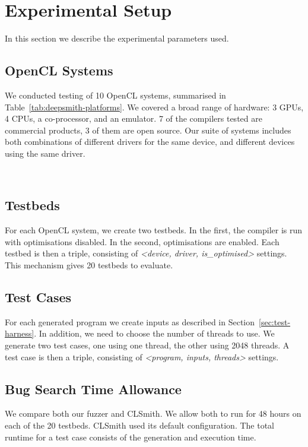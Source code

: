\section{Experimental Setup}
\label{sec:deepsmith-experimental-setup}

In this section we describe the experimental parameters used.

\subsection{OpenCL Systems}

We conducted testing of 10 OpenCL systems, summarised in
Table~\ref{tab:deepsmith-platforms}. We covered a broad range of hardware: 3 GPUs, 4
CPUs, a co-processor, and an emulator. 7 of the compilers tested are commercial
products, 3 of them are open source. Our suite of systems includes both
combinations of different drivers for the same device, and different devices
using the same driver.

\begin{table}
	\centering %
	\subfloat{}\\ %
  \subfloat{} %
	\caption[OpenCL systems and the number of bug reports submitted to date]{%
		OpenCL systems and the number of bug reports submitted to date (22\% of which have been fixed, the remainder are pending). For each system, two testbeds are created, one with compiler optimisations, the other without.%
	}
	\label{tab:deepsmith-platforms}
\end{table}

\subsection{Testbeds}

For each OpenCL system, we create two testbeds. In the first, the compiler is
run with optimisations disabled. In the second, optimisations are enabled. Each
testbed is then a triple, consisting of \emph{<device, driver, is\_optimised>}
settings. This mechanism gives 20 testbeds to evaluate.


\subsection{Test Cases}

For each generated program we create inputs as described in
Section~\ref{sec:test-harness}. In addition, we need to choose the number of
threads to use. We generate two test cases, one using one thread, the other
using 2048 threads. A test case is then a triple, consisting of \emph{<program,
inputs, threads>} settings.

\subsection{Bug Search Time Allowance}

We compare both our fuzzer and CLSmith. We allow both to run for 48 hours on
each of the 20 testbeds. CLSmith used its default configuration. The total
runtime for a test case consists of the generation and execution time.
